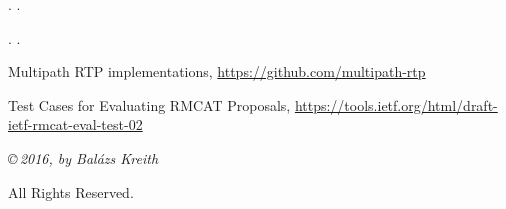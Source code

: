 \documentclass[a4paper]{article}
\begin{document}
.
.



.
.


\begin{thebibliography}{9}
Multipath RTP implementations, \url{https://github.com/multipath-rtp}

Test Cases for Evaluating RMCAT Proposals, \url{https://tools.ietf.org/html/draft-ietf-rmcat-eval-test-02}

\end{thebibliography}

{%
   \vspace*{65mm}
   \thispagestyle{empty}
   \footnotesize\itshape
   \setlength{\parskip}{\baselineskip}
   \setlength{\parindent}{0pt}
   \copyright\,2016, by Balázs Kreith

   All Rights Reserved.
}%
\end{document}
